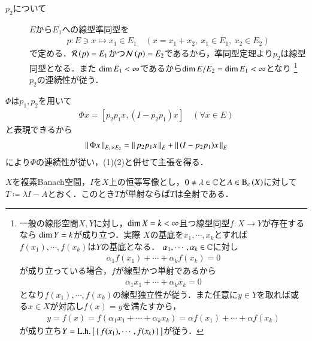 \begin{prf}
\begin{description}
\begin{description}
					\item[$p_2$について] $E$から$E_1$への線型準同型を
						\begin{align}
							p:E \ni x \longmapsto x_1 \in E_1 \quad (x = x_1 + x_2,\ x_1 \in E_1,\ x_2 \in E_2)
						\end{align}
						で定める．$\mathcal{R}\left( p \right) = E_1$かつ$\mathcal{N}\left( p \right) = E_2$であるから，準同型定理より$p_2$は線型同型となる．また
						$\operatorname{dim} E_1 < \infty$であるから$\operatorname{dim} E/E_2 = \operatorname{dim} E_1 < \infty$となり
						\footnote{
							一般の線形空間$X,Y$に対し，$\operatorname{dim} X = k < \infty$且つ線型同型$f:X \rightarrow Y$が存在するなら
							$\operatorname{dim} Y = k$が成り立つ．実際
							$X$の基底を$x_1,\cdots,x_k$とすれば
							$f(x_1),\cdots,f(x_k)$は$Y$の基底となる．
							$\alpha_1,\cdots,\alpha_k \in \mathbb{C}$に対し
							\begin{align}
								\alpha_1 f(x_1) + \cdots + \alpha_k f(x_k) = 0
							\end{align}
							が成り立っている場合，$f$が線型かつ単射であるから
							\begin{align}
								\alpha_1 x_1 + \cdots + \alpha_k x_k = 0
							\end{align}
							となり$f(x_1),\cdots,f(x_k)$の線型独立性が従う．また任意に$y \in Y$を取れば或る$x \in X$が対応し$f(x) = y$を満たすから，
							\begin{align}
								y = f(x) = f(\alpha_1 x_1 + \cdots + \alpha_k x_k) = \alpha f(x_1) + \cdots + \alpha f(x_k)
							\end{align}
							が成り立ち$Y = \mathrm{L.h.}\left[\, \left\{\, f(x_1),\cdots,f(x_k)\, \right\}\, \right]$が従う．
						}
						$p_2$の連続性が従う．
				\end{description}
				$\Phi$は$p_1,p_2$を用いて
				\begin{align}
					\Phi x = [p_2 p_1 x, (I - p_2 p_1) x] \quad (\forall x \in E)
				\end{align}
				と表現できるから
				\begin{align}
					\left\|\, \Phi x\, \right\|_{E_1 \times E_2} = \left\|\, p_2 p_1 x\, \right\|_{E} + \left\|\, (I - p_2 p_1) x\, \right\|_{E} 
				\end{align}
				により$\Phi$の連続性が従い，(1)(2)と併せて主張を得る．
				\QED
		\end{description}
	\end{prf}
	
	\begin{screen}
		\begin{lem}[$T$が単射なら全射]	$X$を複素Banach空間，$I$を$X$上の恒等写像とし，$0 \neq \lambda \in \mathbb{C}$と$A \in \mathrm{B}_c\left(X\right) $に対して
			$T \coloneqq \lambda I - A$とおく．このとき$T$が単射ならば$T$は全射である．
			\label{lem:T_injective_then_surjective}
		\end{lem}
	\end{screen}
	
